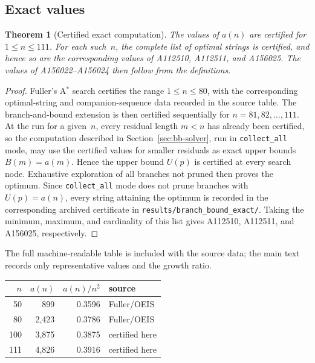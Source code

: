 \documentclass[11pt,a4paper]{article}
\theoremstyle{plain}
\newtheorem{theorem}{Theorem}[section]
\theoremstyle{definition}
\theoremstyle{remark}
\begin{document}
\subsection{Exact values}

\begin{theorem}[Certified exact computation]\label{thm:certified-computation}
  The values of $a(n)$ are certified for $1 \le n \le 111$.  For each
  such~$n$, the complete list of optimal strings is certified, and
  hence so are the corresponding values of A112510, A112511, and
  A156025.  The values of A156022--A156024 then follow from the
  definitions.
\end{theorem}

\begin{proof}
  Fuller's A$^*$ search certifies the range $1 \le n \le 80$, with the
  corresponding optimal-string and companion-sequence data recorded in
  the source table.  The branch-and-bound extension is then certified
  sequentially for $n=81,82,\ldots,111$.  At the run for a given~$n$,
  every residual length $m<n$ has already been certified, so the
  computation described in Section~\ref{sec:bb-solver}, run in
  \texttt{collect\_all} mode, may use the certified values for smaller
  residuals as exact upper bounds $B(m)=a(m)$.  Hence the upper bound
  $U(p)$ is certified at every
  search node.  Exhaustive exploration of all branches not pruned then
  proves the optimum.  Since \texttt{collect\_all} mode does not prune
  branches with $U(p)=a(n)$, every string attaining the optimum is
  recorded in the corresponding archived certificate in
  \texttt{results/branch\_bound\_exact/}.  Taking the minimum, maximum,
  and cardinality of this list gives A112510, A112511, and A156025,
  respectively.
\end{proof}

The full machine-readable table is included with the source data; the
main text records only representative values and the growth ratio.
\begin{center}
\begin{tabular}{rrrl}
  \toprule
  $n$ & $a(n)$ & $a(n)/n^2$ & source \\
  \midrule
  50  & 899        & 0.3596 & Fuller/OEIS \\
  80  & 2{,}423    & 0.3786 & Fuller/OEIS \\
  100 & 3{,}875    & 0.3875 & certified here \\
  111 & 4{,}826    & 0.3916 & certified here \\
  \bottomrule
\end{tabular}
\end{center}
\end{document}

